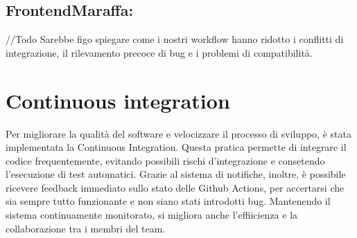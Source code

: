 


\subsection{FrontendMaraffa:} //Todo
Sarebbe figo spiegare come i nostri workflow hanno ridotto i conflitti di integrazione, il rilevamento precoce di bug e i problemi di compatibilità.


\section{Continuous integration}
Per migliorare la qualità del software e velocizzare il processo di sviluppo, è stata implementata la Continuous Integration.
Questa pratica permette di integrare il codice frequentemente, evitando possibili rischi d'integrazione e consetendo 
l'esecuzione di test automatici. Grazie al sistema di notifiche, inoltre, è possibile ricevere feedback immediato sullo stato delle Github Actions,
per accertarsi che sia sempre tutto funzionante e non siano stati introdotti bug. Mantenendo il sistema continuamente monitorato,
si migliora anche l'effiicienza e la collaborazione tra i membri del team.





